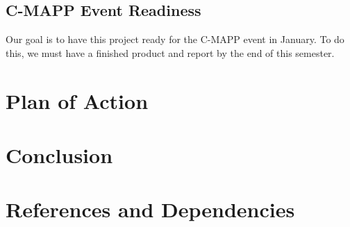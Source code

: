 \documentclass[titlepage,12pt]{article}
\begin{document}
\subsection{C-MAPP Event Readiness}
Our goal is to have this project ready for the C-MAPP event in January. To do
this, we must have a finished product and report by the end of this semester.

\section{Plan of Action}

\section{Conclusion}

\section{References and Dependencies}
\end{document}
